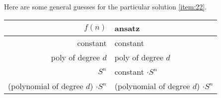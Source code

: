 \documentclass[english]{lbscript}
\begin{document}
Here are some general guesses for the particular solution \ref{item:22}.\\
\begin{tabular}{rl}
  \toprule
  \(f(n)\)                                 & ansatz                                   \\
  \midrule
  constant                                 & constant                                 \\
  poly of degree \(d\)                     & poly of degree \(d\)                     \\
  \(S^{n}\)                                & constant \(⋅ S^{n}\)                     \\
  (polynomial of degree \(d\)) \(⋅ S^{n}\) & (polynomial of degree \(d\)) \(⋅ S^{n}\) \\
  \bottomrule
\end{tabular}
\end{document}
